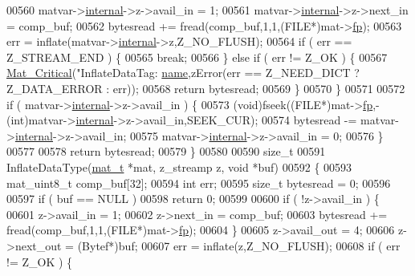 \begin{DoxyCode}
{{{{{{{{{{{{{{{{{00560         matvar->\hyperlink{group___m_a_t_a6e97e3ed9f40c49322c18561c2a94e92}{internal}->z->avail\_in = 1;
00561         matvar->\hyperlink{group___m_a_t_a6e97e3ed9f40c49322c18561c2a94e92}{internal}->z->next\_in = comp\_buf;
00562         bytesread += fread(comp\_buf,1,1,(FILE*)mat->\hyperlink{struct__mat__t_a85f562e407ca9ad4d2a6e14f839432b7}{fp});
00563         err = inflate(matvar->\hyperlink{group___m_a_t_a6e97e3ed9f40c49322c18561c2a94e92}{internal}->z,Z\_NO\_FLUSH);
00564         \textcolor{keywordflow}{if} ( err == Z\_STREAM\_END ) \{
00565             \textcolor{keywordflow}{break};
00566         \} \textcolor{keywordflow}{else} \textcolor{keywordflow}{if} ( err != Z\_OK ) \{
00567             \hyperlink{group__mat__util_gaf51f2bfbb5580f575e4dd79757e2b80c}{Mat\_Critical}(\textcolor{stringliteral}{"InflateDataTag: %
      \hyperlink{group___m_a_t_a5d4b55b041e3b4fb50c04337f05ad909}{name},zError(err == Z\_NEED\_DICT ? Z\_DATA\_ERROR : err));
00568             \textcolor{keywordflow}{return} bytesread;
00569         \}
00570     \}
00571 
00572     \textcolor{keywordflow}{if} ( matvar->\hyperlink{group___m_a_t_a6e97e3ed9f40c49322c18561c2a94e92}{internal}->z->avail\_in ) \{
00573         (void)fseek((FILE*)mat->\hyperlink{struct__mat__t_a85f562e407ca9ad4d2a6e14f839432b7}{fp},-(int)matvar->\hyperlink{group___m_a_t_a6e97e3ed9f40c49322c18561c2a94e92}{internal}->z->avail\_in,SEEK\_CUR);
00574         bytesread -= matvar->\hyperlink{group___m_a_t_a6e97e3ed9f40c49322c18561c2a94e92}{internal}->z->avail\_in;
00575         matvar->\hyperlink{group___m_a_t_a6e97e3ed9f40c49322c18561c2a94e92}{internal}->z->avail\_in = 0;
00576     \}
00577 
00578     \textcolor{keywordflow}{return} bytesread;
00579 \}
00580 
00590 \textcolor{keywordtype}{size\_t}
00591 InflateDataType(\hyperlink{struct__mat__t}{mat\_t} *mat, z\_streamp z, \textcolor{keywordtype}{void} *buf)
00592 \{
00593     mat\_uint8\_t comp\_buf[32];
00594     \textcolor{keywordtype}{int}    err;
00595     \textcolor{keywordtype}{size\_t} bytesread = 0;
00596 
00597     \textcolor{keywordflow}{if} ( buf == NULL )
00598         \textcolor{keywordflow}{return} 0;
00599 
00600     \textcolor{keywordflow}{if} ( !z->avail\_in ) \{
00601         z->avail\_in = 1;
00602         z->next\_in = comp\_buf;
00603         bytesread += fread(comp\_buf,1,1,(FILE*)mat->\hyperlink{struct__mat__t_a85f562e407ca9ad4d2a6e14f839432b7}{fp});
00604     \}
00605     z->avail\_out = 4;
00606     z->next\_out = (Bytef*)buf;
00607     err = inflate(z,Z\_NO\_FLUSH);
00608     \textcolor{keywordflow}{if} ( err != Z\_OK ) \{
}}}}}}}}}}}}}}}}}}
\end{DoxyCode}
